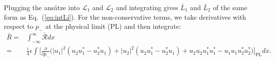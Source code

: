 Plugging the ans\"{a}tze into $\mathcal{L}_1$ and $\mathcal{L}_2$ and integrating gives $\bar{L}_1$ and $\bar{L}_2$ of the same form as Eq.~({\ref{eq:intLi}).
For the non-conservative terms, we take derivatives with respect to $p_-$ at the physical limit ($\mathrm{PL}$) and then integrate: 
\begin{align} 
\bar{R} = &  \int_{-\infty}^{\infty} \bar{\mathcal{R}} dx \nonumber \\
=&  \frac{i }{4} \epsilon \int \Big[ \frac{\partial}{\partial p_-} \Big(|u_1|^2( u_2u_1^* - u_2^* u_1) +  |u_2|^2( u_2u_1^* - u_2^* u_1)  + u_2u_2 u_1^*u_1^* - u_1u_1u_2^*u_2^*\Big) \Big]_{\mathrm{PL}} dx.   

\end{align}}
